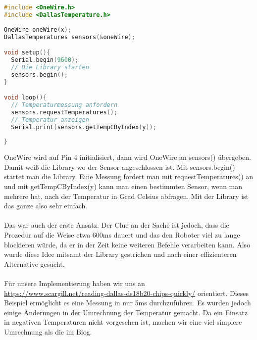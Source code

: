 \documentclass{article}
\begin{document}
\begin{file}[DS18B20]
        \begin{lstlisting}[language=C++]
#include <OneWire.h>
#include <DallasTemperature.h>
		
OneWire oneWire(x);
DallasTemperatures sensors(&oneWire);

void setup(){
  Serial.begin(9600);	
  // Die Library starten
  sensors.begin();
}

void loop(){
  // Temperaturmessung anfordern
  sensors.requestTemperatures();	
  // Temperatur anzeigen
  Serial.print(sensors.getTempCByIndex(y));
  
}

        \end{lstlisting}
\end{file}
OneWire wird auf Pin 4 initialisiert, dann wird OneWire an sensors() übergeben. Damit weiß die Library wo der Sensor angeschlossen ist. Mit sensors.begin() startet man die Library. Eine Messung fordert man mit requestTemperatures() an und mit getTempCByIndex(y) kann man einen bestimmten Sensor, wenn man mehrere hat, nach der Temperatur in Grad Celsius abfragen. Mit der Library ist das ganze also sehr einfach.\\
\\
Das war auch der erste Ansatz. Der Clue an der Sache ist jedoch, dass die Prozedur auf die Weise etwa 600ms dauert und das den Roboter viel zu lange blockieren würde, da er in der Zeit keine weiteren Befehle verarbeiten kann. Also wurde diese Idee mitsamt der Library gestrichen und nach einer effizienteren Alternative gesucht.\\
\\ 
Für unsere Implementierung haben wir uns an\\ \url{https://www.scargill.net/reading-dallas-ds18b20-chips-quickly/} orientiert. Dieses Beispiel ermöglicht es eine Messung in nur 5ms durchzuführen. Es wurden jedoch einige Änderungen in der Umrechnung der Temperatur gemacht. Da ein Einsatz in negativen Temperaturen nicht vorgesehen ist, machen wir eine viel simplere Umrechnung als die im Blog. \\
\\
\end{document}
